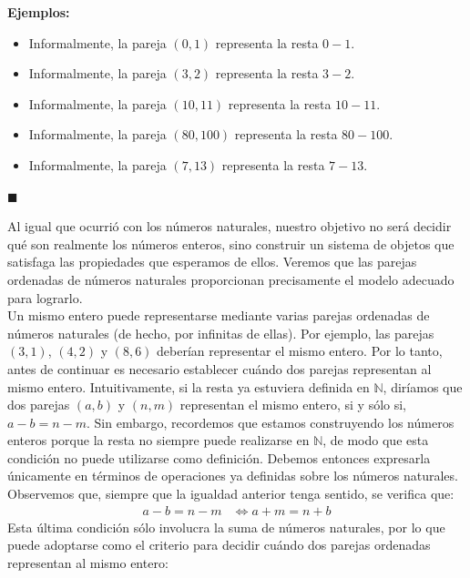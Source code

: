 \documentclass[10 pt]{article}
\begin{document}
\Large{\textbf{Ejemplos:}} \\

\begin{itemize}
    \item \Large{Informalmente, la pareja $(0,1)$ representa la resta $0-1$.} \\

    \item \Large{Informalmente, la pareja $(3,2)$ representa la resta $3-2$.} \\

    \item \Large{Informalmente, la pareja $(10,11)$ representa la resta $10-11$.} \\

    \item \Large{Informalmente, la pareja $(80,100)$ representa la resta $80-100$.} \\

    \item \Large{Informalmente, la pareja $(7,13)$ representa la resta $7-13$.} \\
\end{itemize}

\begin{flushright}
    $\blacksquare$
\end{flushright}

\Large{Al igual que ocurrió con los números naturales, nuestro objetivo no será decidir qué son realmente los números enteros, sino construir un sistema de objetos que satisfaga las propiedades que esperamos de ellos. Veremos que las parejas ordenadas de números naturales proporcionan precisamente el modelo adecuado para lograrlo.} \\

\Large{Un mismo entero puede representarse mediante varias parejas ordenadas de números naturales (de hecho, por infinitas de ellas). Por ejemplo, las parejas $(3,1)$, $(4,2)$ y $(8,6)$ deberían representar el mismo entero. Por lo tanto, antes de continuar es necesario establecer cuándo dos parejas representan al mismo entero. Intuitivamente, si la resta ya estuviera definida en $\mathbb N$, diríamos que dos parejas $(a,b)$ y $(n,m)$ representan el mismo entero, si y sólo si, $a-b=n-m$. Sin embargo, recordemos que estamos construyendo los números enteros porque la resta no siempre puede realizarse en $\mathbb N$, de modo que esta condición no puede utilizarse como definición. Debemos entonces expresarla únicamente en términos de operaciones ya definidas sobre los números naturales. Observemos que, siempre que la igualdad anterior tenga sentido, se verifica que:}
\begin{align*}
    a-b=n-m &\iff a+m=n+b
\end{align*}
\Large{Esta última condición sólo involucra la suma de números naturales, por lo que puede adoptarse como el criterio para decidir cuándo dos parejas ordenadas representan al mismo entero:} \\
\end{document}
